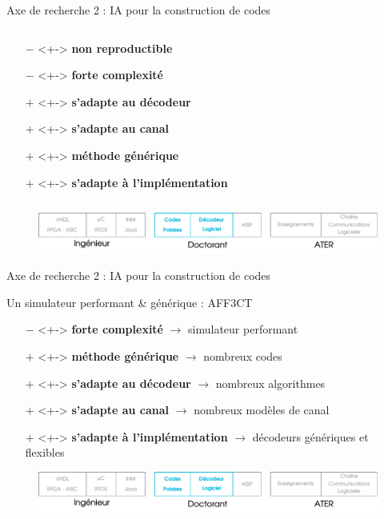 \documentclass[t,compress,mathserif,12pt,xcolor=dvipsnames]{beamer}
\newcommand{\RED} [1]{\textcolor{Paired-5}{\textbf{#1}}}
\newcommand{\GREEN} [1]{\textcolor{Paired-3}{\textbf{#1}}}
\begin{document}
\begin{frame}[t]{Axe de recherche 2 : IA pour la construction de codes}
\begin{minipage}[t][5.0cm][t]{\textwidth}
\begin{columns}[T]
\begin{column}{0.45\textwidth}
{\begin{itemize}
          \setlength\itemsep{-0.5em}
          \item[\RED{$-$}]  <+-> \RED  {non reproductible}
          \item[\RED{$-$}]  <+-> \RED  {forte complexité}
          \item[\GREEN{$+$}]<+-> \GREEN{s'adapte au décodeur}
          \item[\GREEN{$+$}]<+-> \GREEN{s'adapte au canal}
          \item[\GREEN{$+$}]<+-> \GREEN{méthode générique}
          \item[\GREEN{$+$}]<+-> \GREEN{s'adapte à l'implémentation}
        \end{itemize}
        }
      \end{column}
    \end{columns}
  \end{minipage}
  \begin{figure}[htp]
    \centering
    \includegraphics[width=\textwidth]{fig/frise24}
  \end{figure}
\end{frame}


\begin{frame}[t]{Axe de recherche 2 : IA pour la construction de codes}
  \begin{minipage}[t][5.0cm][t]{\textwidth}
    \begin{center}
      Un simulateur performant \& générique : AFF3CT
    \end{center}
    \begin{itemize}
      \item[\RED{$-$}]  <+-> \RED  {forte complexité} $\rightarrow$ simulateur performant
      \item[\GREEN{$+$}]<+-> \GREEN{méthode générique} $\rightarrow$ nombreux codes
      \item[\GREEN{$+$}]<+-> \GREEN{s'adapte au décodeur} $\rightarrow$ nombreux algorithmes
      \item[\GREEN{$+$}]<+-> \GREEN{s'adapte au canal} $\rightarrow$ nombreux modèles de canal
      \item[\GREEN{$+$}]<+-> \GREEN{s'adapte à l'implémentation} $\rightarrow$ décodeurs génériques et flexibles
    \end{itemize}
\end{minipage}
\begin{figure}[htp]
  \centering
  \includegraphics[width=\textwidth]{fig/frise24}
\end{figure}
\end{frame}
\end{document}
